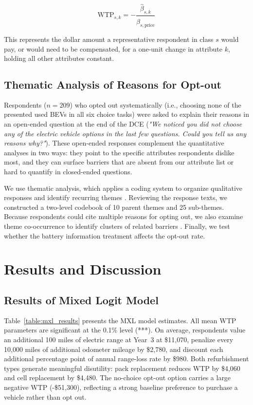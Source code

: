 \documentclass[a4paper,fleqn]{cas-sc}   %
\begin{document}
\begin{equation}
    \text{WTP}_{s,k} = -\frac{\hat{\beta}_{s,k}}{\hat{\beta}_{s,\text{price}}}
    \label{eq:wtp}
\end{equation}

\noindent This represents the dollar amount a representative respondent in class $s$ would pay, or would need to be compensated, for a one-unit change in attribute $k$, holding all other attributes constant.

\subsection{Thematic Analysis of Reasons for Opt-out}
Respondents ($n=209$) who opted out systematically (i.e., choosing none of the presented used BEVs in all six choice tasks) were asked to explain their reasons in an open-ended question at the end of the DCE (\textit{"We noticed you did not choose any of the electric vehicle options in the last few questions. Could you tell us any reasons why?"}). These open-ended responses complement the quantitative analyses in two ways: they point to the specific attributes respondents dislike most, and they can surface barriers that are absent from our attribute list or hard to quantify in closed-ended questions. 

We use thematic analysis, which applies a coding system to organize qualitative responses and identify recurring themes \parencite{braunUsingThematicAnalysis2006}. Reviewing the response texts, we constructed a two-level codebook of 10 parent themes and 25 sub-themes. Because respondents could cite multiple reasons for opting out,  we also examine theme co-occurrence to identify clusters of related barriers \parencite{krishnaUnderstandingIdentifyingBarriers2021}. Finally, we test whether the battery information treatment affects the opt-out rate.

\section{Results and Discussion}
\label{section:results}

\subsection{Results of Mixed Logit Model}

Table~\ref{table:mxl_results} presents the MXL model estimates. All mean WTP parameters are significant at the 0.1\% level (***). On average, respondents value an additional 100 miles of electric range at Year~3 at \$11,070, penalize every 10,000 miles of additional odometer mileage by \$2,780, and discount each additional percentage point of annual range-loss rate by \$980. Both refurbishment types generate meaningful disutility: pack replacement reduces WTP by \$4,060 and cell replacement by \$4,480. The no-choice opt-out option carries a large negative WTP (-\$51,300), reflecting a strong baseline preference to purchase a vehicle rather than opt out.
\end{document}
